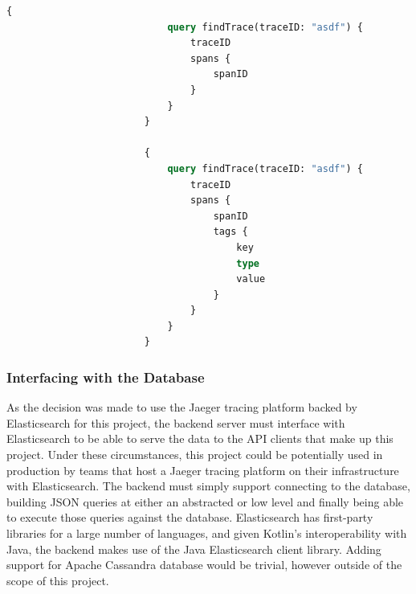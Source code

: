 \documentclass[12pt,pdftex,titlepage]{report}
\begin{document}
                    \newpage
                    \begin{lstlisting}[caption={A GraphQL query to fetch a trace object and the span ID of each of its spans compared to a query to fetch the trace object, its spans and every
                        tag of every span.}, label={lst:graphTrace}, language=GraphQL, gobble=24]
                        {
                            query findTrace(traceID: "asdf") {
                                traceID
                                spans {
                                    spanID
                                }
                            }
                        }

                        {
                            query findTrace(traceID: "asdf") {
                                traceID
                                spans {
                                    spanID
                                    tags {
                                        key
                                        type
                                        value
                                    }
                                }
                            }
                        }
                    \end{lstlisting}

                \subsubsection{Interfacing with the Database}
                    As the decision was made to use the Jaeger tracing platform backed by Elasticsearch for this project, the backend server must interface with Elasticsearch
                    to be able to serve the data to the API clients that make up this project. Under these circumstances, this project could be potentially used in production
                    by teams that host a Jaeger tracing platform on their infrastructure with Elasticsearch. The backend must simply support connecting to the database, building 
                    JSON queries at either an abstracted or low level and finally being able to execute those queries against the database. Elasticsearch has first-party libraries
                    for a  large number of languages, and given Kotlin's interoperability with Java, the backend makes use of the Java Elasticsearch client library. Adding support 
                    for Apache Cassandra database would be trivial, however outside of the scope of this project.
\end{document}
